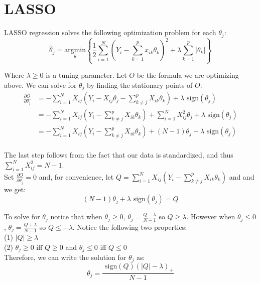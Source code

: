 \documentclass[12pt]{article}
\newcommand{\thh}{\hat{\theta}}
\newcommand{\sgn}{\text{ sign}}
\begin{document}
\section{LASSO}
LASSO regression solves the following optimization problem for each $\theta_j$\cite{ht}:
	$$\thh_j = \underset{\theta}{\text{argmin}}\left\{ \frac{1}{2} \sum\limits_{i=1}^N \left(Y_i - \sum\limits_{k=1}^px_{ik}\theta_k \right)^2 + \lambda \sum\limits_{k=1}^p|\theta_k| \right\}$$

Where $\lambda \geq 0$ is a tuning parameter.  Let $O$ be the formula we are optimizing above.  We can solve for $\theta_j$ by finding the stationary points of $O$:
\begin{equation}\begin{split}
	\frac{\partial O}{\partial \theta_j}
		& = -\sum\limits_{i=1}^N X_{ij}(Y_i - X_{ij}\theta_j - \sum\limits_{k \ne j}^p X_{ik}\theta_k) + \lambda \sgn(\theta_j) \\
		& = -\sum\limits_{i=1}^N X_{ij}(Y_i - \sum\limits_{k \ne j}^p X_{ik}\theta_k) + \sum\limits_{i=1}^NX_{ij}^2\theta_j + \lambda \sgn(\theta_j) \\
		& = -\sum\limits_{i=1}^N X_{ij}(Y_i - \sum\limits_{k \ne j}^p X_{ik}\theta_k) +(N-1)\theta_j + \lambda \sgn(\theta_j) \\
\end{split}\end{equation}

The last step follows from the fact that our data is standardized, and thus $\sum\limits_{i=1}^NX_{ij}^2 = N-1$.  \\

Set $\frac{\partial O}{\partial \theta_j}=0$ and, for convenience, let $Q = \sum\limits_{i=1}^N X_{ij}(Y_i - \sum\limits_{k \ne j}^p X_{ik}\theta_k)$ and and we get:
	$$(N-1)\theta_j + \lambda\sgn(\theta_j) = Q$$

To solve for $\theta_j$ notice that when $\theta_j \geq 0$, $\theta_j=\frac{Q-\lambda}{N-1}$ so $Q \geq \lambda$.  However when $\theta_j \leq 0$, $\theta_j=\frac{Q+\lambda}{N-1}$ so $Q \leq -\lambda$.  Notice the following two properties: \\
	\hspace*{1cm} (1) $|Q| \geq \lambda$ \\
	\hspace*{1cm} (2) $\theta_j \geq 0$ iff $Q \geq 0$ and $\theta_j \leq 0$ iff $Q \leq 0$ \\

Therefore, we can write the solution for $\theta_j$ as:
	$$\theta_j = \frac{\sgn(Q)(|Q|-\lambda)_+}{N-1}$$
\end{document}
